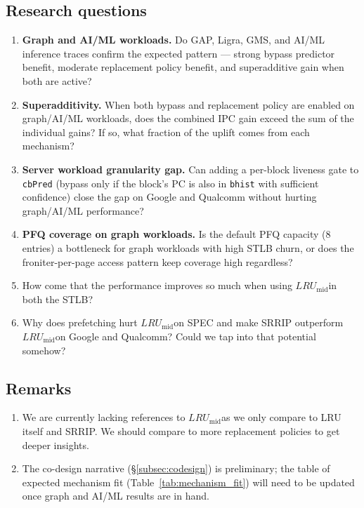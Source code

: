 \documentclass[12pt]{article}
\newcommand{\lrumid}{$LRU_\text{mid}$}
\begin{document}
\subsection{Research questions}
\begin{enumerate}
  \item \textbf{Graph and AI/ML workloads.}
    Do GAP, Ligra, GMS, and AI/ML inference traces confirm the expected
    pattern --- strong bypass predictor benefit, moderate replacement policy
    benefit, and superadditive gain when both are active?
  \item \textbf{Superadditivity.}
    When both bypass and replacement policy are enabled on graph/AI/ML
    workloads, does the combined IPC gain exceed the sum of the individual
    gains?  If so, what fraction of the uplift comes from each mechanism?
  \item \textbf{Server workload granularity gap.}
    Can adding a per-block liveness gate to \texttt{cbPred} (bypass only if
    the block's PC is also in \texttt{bhist} with sufficient confidence) close
    the gap on Google and Qualcomm without hurting graph/AI/ML performance?
  \item \textbf{PFQ coverage on graph workloads.}
    Is the default PFQ capacity (8 entries) a bottleneck for graph workloads
    with high STLB churn, or does the froniter-per-page access pattern keep
    coverage high regardless?
  \item How come that the performance improves so much when using \lrumid in
    both the STLB?
  \item Why does prefetching hurt \lrumid on SPEC and make SRRIP outperform
    \lrumid on Google and Qualcomm? Could we tap into that potential somehow?
\end{enumerate}

\subsection{Remarks}
\begin{enumerate}
  \item We are currently lacking references to \lrumid as we only compare to
    LRU itself and SRRIP. We should compare to more replacement policies to get deeper insights.
  \item The co-design narrative (\S\ref{subsec:codesign}) is preliminary;
    the table of expected mechanism fit (Table~\ref{tab:mechanism_fit}) will
    need to be updated once graph and AI/ML results are in hand.
\end{enumerate}
\end{document}
